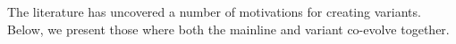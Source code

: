 The literature has uncovered a number of motivations for creating variants. Below, we present those where both the mainline and variant co-evolve together.%


